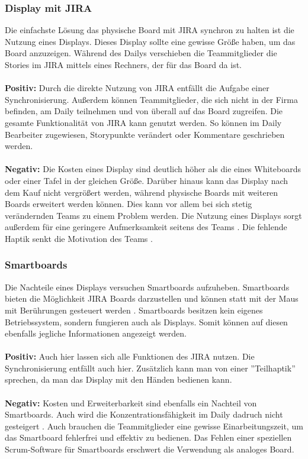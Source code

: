 \documentclass[12pt,titlepage]{scrartcl}
\begin{document}
		\subsubsection{Display mit JIRA}
		Die einfachste Lösung das physische Board mit JIRA synchron zu halten ist die Nutzung eines Displays. Dieses Display sollte eine gewisse Größe haben, um das Board anzuzeigen. Während des Dailys verschieben die Teammitglieder die Stories im JIRA mittels eines Rechners, der für das Board da ist.
		\\ \\
		\textbf{Positiv: }Durch die direkte Nutzung von JIRA entfällt die Aufgabe einer Synchronisierung. Außerdem können Teammitglieder, die sich nicht in der Firma befinden, am Daily teilnehmen und von überall auf das Board zugreifen. Die gesamte Funktionalität von JIRA kann genutzt werden. So können im Daily Bearbeiter zugewiesen, Storypunkte verändert oder Kommentare geschrieben werden.
		\\ \\
		\textbf{Negativ: }Die Kosten eines Display sind deutlich höher als die eines Whiteboards oder einer Tafel in der gleichen Größe. Darüber hinaus kann das Display nach dem Kauf nicht vergrößert werden, während physische Boards mit weiteren Boards erweitert werden können. Dies kann vor allem bei sich stetig verändernden Teams zu einem Problem werden. Die Nutzung eines Displays sorgt außerdem für eine geringere Aufmerksamkeit seitens des Teams \cite{pen}. Die fehlende Haptik senkt die Motivation des Teams \cite{progress}. 
		\subsubsection{Smartboards}
		Die Nachteile eines Displays versuchen Smartboards aufzuheben. Smartboards bieten die Möglichkeit JIRA Boards darzustellen und können statt mit der Maus mit Berührungen gesteuert werden \cite{smart}. Smartboards besitzen kein eigenes Betriebssystem, sondern fungieren auch als Displays. Somit können auf diesen ebenfalls jegliche Informationen angezeigt werden.
		\\ \\
		\textbf{Positiv: }Auch hier lassen sich alle Funktionen des JIRA nutzen. Die Synchronisierung entfällt auch hier. Zusätzlich kann man von einer ''Teilhaptik'' sprechen, da man das Display mit den Händen bedienen kann. 
		\\ \\
		\textbf{Negativ: }Kosten und Erweiterbarkeit sind ebenfalls ein Nachteil von Smartboards. Auch wird die Konzentrationsfähigkeit im Daily dadruch nicht gesteigert \cite{pen}. Auch brauchen die Teammitglieder eine gewisse Einarbeitungszeit, um das Smartboard fehlerfrei und effektiv zu bedienen. Das Fehlen einer speziellen Scrum-Software für Smartboards erschwert die Verwendung als analoges Board.
		
\end{document}
